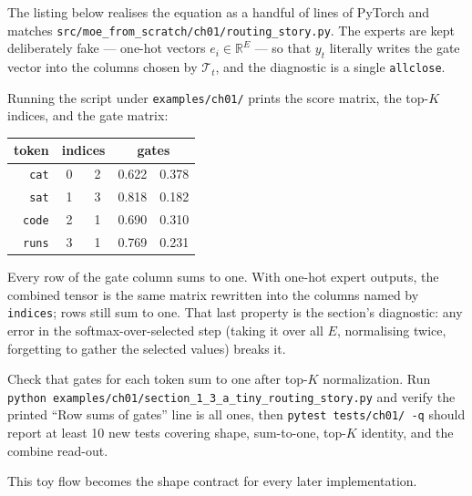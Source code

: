 The listing below realises the equation as a handful of lines of PyTorch and matches \texttt{src/moe\_from\_scratch/ch01/routing\_story.py}. The experts are kept deliberately fake --- one-hot vectors $e_i \in \mathbb{R}^E$ --- so that $y_t$ literally writes the gate vector into the columns chosen by $\mathcal{T}_t$, and the diagnostic is a single \texttt{allclose}.



Running the script under \texttt{examples/ch01/} prints the score matrix, the top-$K$ indices, and the gate matrix:
%
\begin{center}\small\begin{tabular}{r|cc|cc}
\hline
token & \multicolumn{2}{c|}{\textbf{indices}} & \multicolumn{2}{c}{\textbf{gates}} \\
\hline
\texttt{cat}  & 0 & 2 & 0.622 & 0.378 \\
\texttt{sat}  & 1 & 3 & 0.818 & 0.182 \\
\texttt{code} & 2 & 1 & 0.690 & 0.310 \\
\texttt{runs} & 3 & 1 & 0.769 & 0.231 \\
\hline
\end{tabular}\end{center}
%
Every row of the gate column sums to one. With one-hot expert outputs, the combined tensor is the same matrix rewritten into the columns named by \texttt{indices}; rows still sum to one. That last property is the section's diagnostic: any error in the softmax-over-selected step (taking it over all $E$, normalising twice, forgetting to gather the selected values) breaks it.

\begin{checkpointbox}
Check that gates for each token sum to one after top-$K$ normalization. Run \texttt{python examples/ch01/section\_1\_3\_a\_tiny\_routing\_story.py} and verify the printed ``Row sums of gates'' line is all ones, then \texttt{pytest tests/ch01/ -q} should report at least 10 new tests covering shape, sum-to-one, top-$K$ identity, and the combine read-out.
\end{checkpointbox}

This toy flow becomes the shape contract for every later implementation.
